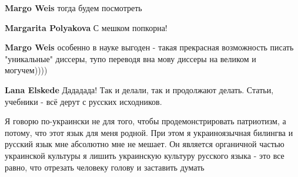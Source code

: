 \begin{itemize}
\begin{itemize}
 
\textbf{Margo Weis} тогда будем посмотреть

 
\textbf{Margarita Polyakova} С мешком попкорна!

 
\textbf{Margo Weis} особенно в науке выгоден - такая прекрасная возможность писать "уникальные" диссеры, тупо переводя вна мову диссеры на великом и могучем))))

 
\textbf{Lana Elskede} Дададада! Так и делали, так и продолжают делать. Статьи, учебники - всё дерут с русских исходников.

 

Я говорю по-украински не для того, чтобы продемонстрировать патриотизм, а
потому, что этот язык для меня родной. При этом я украиноязычная билингва и
русский язык мне абсолютно мне не мешает. Он является органичной частью
украинской культуры я лишить украинскую культуру русского языка - это все
равно, что отрезать человеку голову и заставить думать


 

\end{itemize}
\end{itemize}
